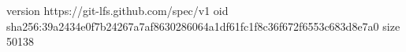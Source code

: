 version https://git-lfs.github.com/spec/v1
oid sha256:39a2434e0f7b24267a7af8630286064a1df61fc1f8c36f672f6553c683d8e7a0
size 50138
